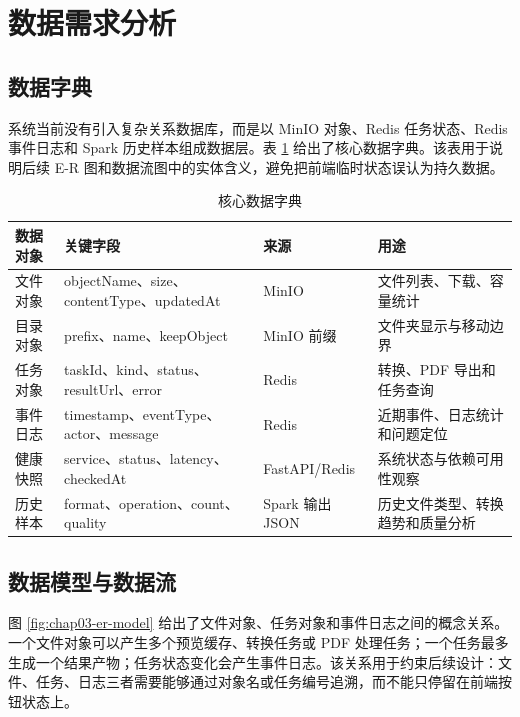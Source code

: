 \section{数据需求分析}

\subsection{数据字典}

系统当前没有引入复杂关系数据库，而是以 MinIO 对象、Redis 任务状态、Redis 事件日志和 Spark 历史样本组成数据层。表 \ref{tab:chap03-data-dictionary} 给出了核心数据字典。该表用于说明后续 E-R 图和数据流图中的实体含义，避免把前端临时状态误认为持久数据。

\begin{table}[H]
  \centering
  \small
  \caption{核心数据字典}
  \label{tab:chap03-data-dictionary}
  \begin{tabularx}{\textwidth}{llXX}
    \toprule
    数据对象 & 关键字段 & 来源 & 用途 \\
    \midrule
    文件对象 & objectName、size、contentType、updatedAt & MinIO & 文件列表、下载、容量统计 \\
    目录对象 & prefix、name、keepObject & MinIO 前缀 & 文件夹显示与移动边界 \\
    任务对象 & taskId、kind、status、resultUrl、error & Redis & 转换、PDF 导出和任务查询 \\
    事件日志 & timestamp、eventType、actor、message & Redis & 近期事件、日志统计和问题定位 \\
    健康快照 & service、status、latency、checkedAt & FastAPI/Redis & 系统状态与依赖可用性观察 \\
    历史样本 & format、operation、count、quality & Spark 输出 JSON & 历史文件类型、转换趋势和质量分析 \\
    \bottomrule
  \end{tabularx}
\end{table}

\subsection{数据模型与数据流}

图 \ref{fig:chap03-er-model} 给出了文件对象、任务对象和事件日志之间的概念关系。一个文件对象可以产生多个预览缓存、转换任务或 PDF 处理任务；一个任务最多生成一个结果产物；任务状态变化会产生事件日志。该关系用于约束后续设计：文件、任务、日志三者需要能够通过对象名或任务编号追溯，而不能只停留在前端按钮状态上。

